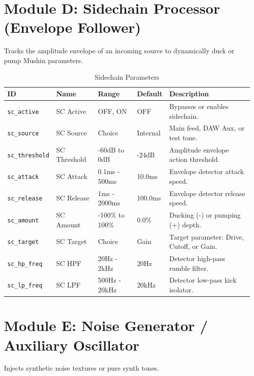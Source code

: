 \documentclass[11pt,a4paper,oneside]{book}
\begin{document}
\section{Module D: Sidechain Processor (Envelope Follower)}
Tracks the amplitude envelope of an incoming source to dynamically duck or pump Mushin parameters.

\begin{table}[h]
    \centering
    \caption{Sidechain Parameters}
    \begin{tabular}{lllll}
        \toprule
        \textbf{ID} & \textbf{Name} & \textbf{Range} & \textbf{Default} & \textbf{Description} \\
        \midrule
        \texttt{sc\_active} & SC Active & OFF, ON & OFF & Bypasses or enables sidechain. \\
        \texttt{sc\_source} & SC Source & Choice & Internal & Main feed, DAW Aux, or test tone. \\
        \texttt{sc\_threshold} & SC Threshold & -60dB to 0dB & -24dB & Amplitude envelope action threshold. \\
        \texttt{sc\_attack} & SC Attack & 0.1ms - 500ms & 10.0ms & Envelope detector attack speed. \\
        \texttt{sc\_release} & SC Release & 1ms - 2000ms & 100.0ms & Envelope detector release speed. \\
        \texttt{sc\_amount} & SC Amount & -100\% to 100\% & 0.0\% & Ducking (-) or pumping (+) depth. \\
        \texttt{sc\_target} & SC Target & Choice & Gain & Target parameter: Drive, Cutoff, or Gain. \\
        \texttt{sc\_hp\_freq} & SC HPF & 20Hz - 2kHz & 20Hz & Detector high-pass rumble filter. \\
        \texttt{sc\_lp\_freq} & SC LPF & 500Hz - 20kHz & 20kHz & Detector low-pass kick isolator. \\
        \bottomrule
    \end{tabular}
\end{table}

\section{Module E: Noise Generator / Auxiliary Oscillator}
Injects synthetic noise textures or pure synth tones.
\end{document}
